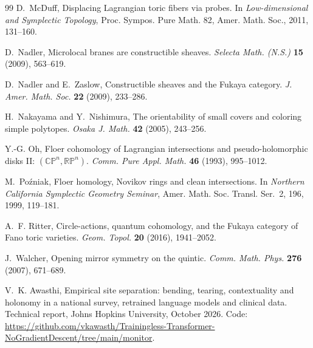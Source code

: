 \documentclass[11pt]{article}
\theoremstyle{definition}
\theoremstyle{remark}
\begin{document}
\begin{thebibliography}{99}
D.~McDuff, Displacing Lagrangian toric fibers via probes. In \emph{Low-dimensional and Symplectic Topology}, Proc. Sympos. Pure Math.
82, Amer. Math. Soc., 2011, 131--160.

D.~Nadler, Microlocal branes are constructible sheaves. \emph{Selecta Math. (N.S.)} \textbf{15} (2009), 563--619.

D.~Nadler and E.~Zaslow, Constructible sheaves and the Fukaya category. \emph{J. Amer. Math. Soc.} \textbf{22} (2009), 233--286.

H.~Nakayama and Y.~Nishimura, The orientability of small covers and coloring simple polytopes. \emph{Osaka J. Math.} \textbf{42}
(2005), 243--256.

Y.-G. Oh, Floer cohomology of Lagrangian intersections and pseudo-holomorphic disks {II}: $(\mathbb{CP}^n,\mathbb{RP}^n)$.
\emph{Comm. Pure Appl. Math.} \textbf{46} (1993), 995--1012.

M.~Po\'zniak, Floer homology, Novikov rings and clean intersections. In \emph{Northern California Symplectic Geometry Seminar},
Amer. Math. Soc. Transl. Ser.~2, 196, 1999, 119--181.

A.~F. Ritter, Circle-actions, quantum cohomology, and the Fukaya category of Fano toric varieties. \emph{Geom. Topol.} \textbf{20}
(2016), 1941--2052.

J.~Walcher, Opening mirror symmetry on the quintic. \emph{Comm. Math. Phys.} \textbf{276} (2007), 671--689.

V.~K. Awasthi, Empirical site separation: bending, tearing, contextuality and holonomy in a national survey, retrained language models and
clinical data. Technical report, Johns Hopkins University, October 2026. Code: \url{https://github.com/vkawasth/Trainingless-Transformer-NoGradientDescent/tree/main/monitor}.

\end{thebibliography}
\end{document}
